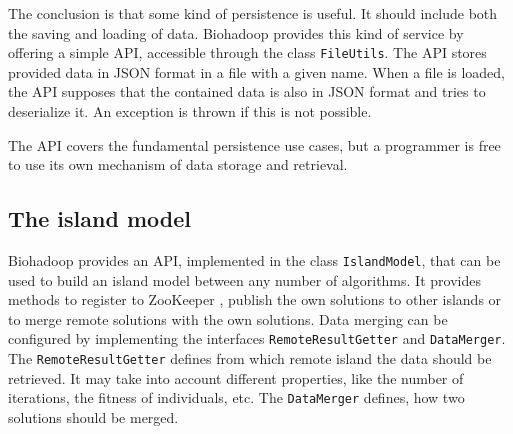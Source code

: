 The conclusion is that some kind of persistence is useful. It should include both the saving and loading of data. Biohadoop provides this kind of service by offering a simple API, accessible through the class \texttt{FileUtils}. The API stores provided data in JSON format in a file with a given name. When a file is loaded, the API supposes that the contained data is also in JSON format and tries to deserialize it. An exception is thrown if this is not possible.

The API covers the fundamental persistence use cases, but a programmer is free to use its own mechanism of data storage and retrieval.

\subsection{The island model}
\label{chap:impl:island-model}
% 
% 
% 
Biohadoop provides an API, implemented in the class \texttt{IslandModel}, that can be used to build an island model between any number of algorithms. It provides methods to register to ZooKeeper \cite{zookeeper}, publish the own solutions to other islands or to merge remote solutions with the own solutions. Data merging can be configured by implementing the interfaces \texttt{RemoteResultGetter} and \texttt{DataMerger}. The \texttt{RemoteResultGetter} defines from which remote island the data should be retrieved. It may take into account different properties, like the number of iterations, the fitness of individuals, etc. The \texttt{DataMerger} defines, how two solutions should be merged.

